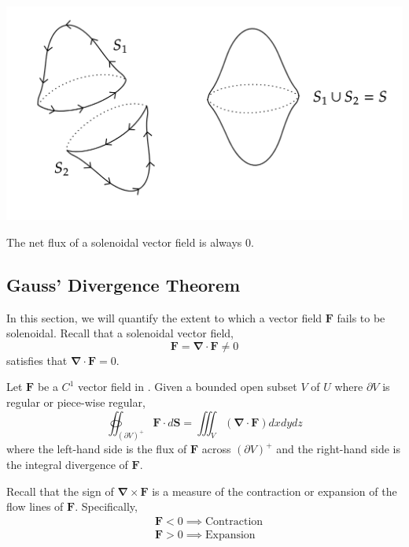 \begin{marginfigure}
	\begin{center}
	\includegraphics[width=\linewidth]{figures/wk-7/fig-4.png}
	\end{center}
\end{marginfigure}

\begin{cor}
	The net flux of a solenoidal vector field is always $0$.
\end{cor}

\subsection{Gauss' Divergence Theorem}
In this section, we will quantify the extent to which a vector field $\mathbf{F}$ fails to be solenoidal. Recall that a solenoidal vector field,
\[\mathbf{F} = \mathbf{\nabla} \cdot \mathbf{F} \neq 0\]
satisfies that $\mathbf{\nabla} \cdot \mathbf{F} = 0$.

\begin{thm}
	Let $\mathbf{F}$ be a $C^1$ vector field in . Given a bounded open subset $V$ of $U$ where $\partial V$ is regular or piece-wise regular, 
	\[\oiint_{(\partial V)^+}\mathbf{F} \cdot d \mathbf{S}=\iiint_V(\mathbf{\nabla} \cdot \mathbf{F}) d x d y d z\]
	where the left-hand side is the flux of $\mathbf{F}$ across $(\partial V)^+$ and the right-hand side is the integral divergence of $\mathbf{F}$.
\end{thm}

\begin{marginfigure}
	Recall that the sign of $\mathbf{\nabla} \times \mathbf{F}$ is a measure of the contraction or expansion of the flow lines of $\mathbf{F}$. Specifically,
	\begin{align*}
		&\mathbf{F} < 0 \implies \text{Contraction} \\
		&\mathbf{F} > 0 \implies \text{Expansion} \\
	\end{align*}
\end{marginfigure}

